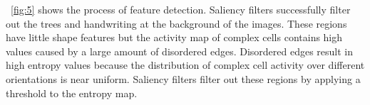 \documentclass[twocolumn]{article}
\begin{document}
\figurename~\ref{fig:5} shows the process of feature detection.
Saliency filters successfully filter out the trees and handwriting at the background of the images.
These regions have little shape features but the activity map of complex cells contains high values caused by a large amount of disordered edges. 
Disordered edges result in high entropy values because the distribution of complex cell activity over different orientations is near uniform.
Saliency filters filter out these regions by applying a threshold to the entropy map.

\begin{figure}
\centering
{}\hfil
{}\hfil
{}\\
\hfil
{}\hfil

\end{figure}
\end{document}
